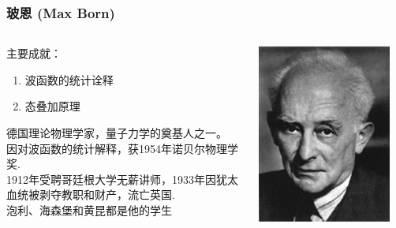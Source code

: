 \begin{frame}
    \frametitle{玻恩 (Max Born)}
        \begin{columns}
            \begin{column}[t]{0.46\linewidth}
                主要成就：
                \begin{enumerate}
                    \item 波函数的统计诠释
                    \item 态叠加原理
                \end{enumerate}
                德国理论物理学家，量子力学的奠基人之一。\\
                因对波函数的统计解释，获1954年诺贝尔物理学奖.\\
                1912年受聘哥廷根大学无薪讲师，1933年因犹太血统被剥夺教职和财产，流亡英国.\\ \vspace{0.3em}
                泡利、海森堡和黄昆都是他的学生
            \end{column}
            \begin{column}[t]{0.46\linewidth}
                \begin{center}
                    \includegraphics[width=0.9\textwidth]{figs/Born.png} \\
                \end{center} 
            \end{column}           
        \end{columns}
\end{frame}

